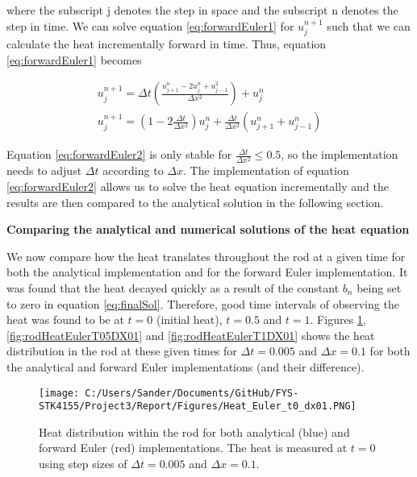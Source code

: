 \documentclass[12pt,a4paper]{article}
\begin{document}
\noindent where the subscript j denotes the step in space and the subscript n denotes the step in time. We can solve equation \ref{eq:forwardEuler1} for $u_j^{n+1}$ such that we can calculate the heat incrementally forward in time. Thus, equation \ref{eq:forwardEuler1} becomes

\begin{equation}\label{eq:forwardEuler2}
\begin{aligned}
u_j^{n+1} = \Delta t(\frac{u_{j+1}^n - 2u_j^n + u_{j-1}^2}{\Delta x^2})+u_j^n
\\
u_j^{n+1} = (1-2\frac{\Delta t}{\Delta x^2})u_j^n + \frac{\Delta t}{\Delta x^2}(u_{j+1}^n + u_{j-1}^n)
\end{aligned}
\end{equation}

\noindent Equation \ref{eq:forwardEuler2} is only stable for $\frac{\Delta t}{\Delta x^2} \leq 0.5$, so the implementation needs to adjust $\Delta t$ according to $\Delta x$. The implementation of equation \ref{eq:forwardEuler2} allows us to solve the heat equation incrementally and the results are then compared to the analytical solution in the following section.

\begin{center}
\large{\textbf{Comparing the analytical and numerical solutions of the heat equation}}
\end{center}

\noindent We now compare how the heat translates throughout the rod at a given time for both the analytical implementation and for the forward Euler implementation. It was found that the heat decayed quickly as a result of the constant $b_n$ being set to zero in equation \ref{eq:finalSol}. Therefore, good time intervals of observing the heat was found to be at $t = 0$ (initial heat), $t = 0.5$ and $t = 1$. Figures \ref{fig:rodHeatEulerT0DX01}, \ref{fig:rodHeatEulerT05DX01} and \ref{fig:rodHeatEulerT1DX01} shows the heat distribution in the rod at these given times for $\Delta t = 0.005$ and $\Delta x = 0.1$ for both the analytical and forward Euler implementations (and their difference).

\begin{figure}[H]
\centering
\texttt{[image: C:/Users/Sander/Documents/GitHub/FYS-STK4155/Project3/Report/Figures/Heat\_Euler\_t0\_dx01.PNG]}
\caption{\label{fig:rodHeatEulerT0DX01} Heat distribution within the rod for both analytical (blue) and forward Euler (red) implementations. The heat is measured at $t = 0$ using step sizes of $\Delta t = 0.005$ and $\Delta x = 0.1$.}
\end{figure}
\end{document}
